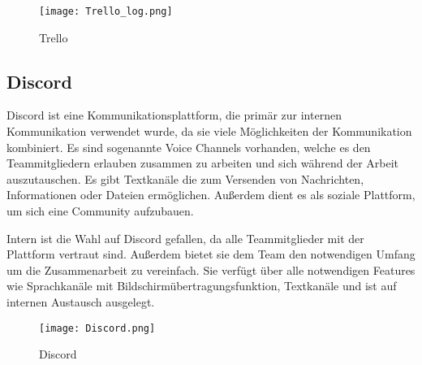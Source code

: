 \begin{figure}[H]
    \texttt{[image: Trello\_log.png]}
    \caption{Trello}
\end{figure}
%
\subsection{Discord}\label{subsec:Discord}
Discord ist eine Kommunikationsplattform, die primär zur internen Kommunikation verwendet wurde, da sie viele Möglichkeiten der Kommunikation kombiniert.
Es sind sogenannte Voice Channels vorhanden, welche es den Teammitgliedern erlauben zusammen zu arbeiten und sich während der Arbeit auszutauschen.
Es gibt Textkanäle die zum Versenden von Nachrichten, Informationen oder Dateien ermöglichen.
Außerdem dient es als soziale Plattform, um sich eine Community aufzubauen.

Intern ist die Wahl auf Discord gefallen, da alle Teammitglieder mit der Plattform vertraut sind.
Außerdem bietet sie dem Team den notwendigen Umfang um die Zusammenarbeit zu vereinfach.
Sie verfügt über alle notwendigen Features wie Sprachkanäle mit Bildschirmübertragungsfunktion, Textkanäle und ist auf internen Austausch ausgelegt.

\begin{figure}[H]
\texttt{[image: Discord.png]}\caption{Discord}
\end{figure}
%

\renewcommand{\kapitelautor}{}

